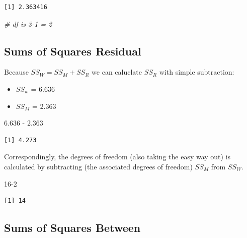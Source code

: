 \documentclass[
  11pt,
]{book}
\newenvironment{Shaded}{\begin{snugshade}}{\end{snugshade}}
\newcommand{\CommentTok}[1]{\textcolor[rgb]{0.56,0.35,0.01}{\textit{#1}}}
\newcommand{\DecValTok}[1]{\textcolor[rgb]{0.00,0.00,0.81}{#1}}
\newcommand{\FloatTok}[1]{\textcolor[rgb]{0.00,0.00,0.81}{#1}}
\newcommand{\SpecialCharTok}[1]{\textcolor[rgb]{0.00,0.00,0.00}{#1}}
\providecommand{\tightlist}{%
  \setlength{\itemsep}{0pt}\setlength{\parskip}{0pt}}
\begin{document}
\begin{verbatim}
[1] 2.363416
\end{verbatim}

\begin{Shaded}
\begin{Highlighting}[]
\CommentTok{\# df is 3{-}1 = 2}
\end{Highlighting}
\end{Shaded}

\hypertarget{sums-of-squares-residual}{%
\subsection{Sums of Squares Residual}\label{sums-of-squares-residual}}

Because \(SS_W = SS_M + SS_R\) we can caluclate \(SS_R\) with simple subtraction:

\begin{itemize}
\tightlist
\item
  \(SS_w\) = 6.636
\item
  \(SS_M\) = 2.363
\end{itemize}

\begin{Shaded}
\begin{Highlighting}[]
\FloatTok{6.636} \SpecialCharTok{{-}} \FloatTok{2.363}
\end{Highlighting}
\end{Shaded}

\begin{verbatim}
[1] 4.273
\end{verbatim}

Correspondingly, the degrees of freedom (also taking the easy way out) is calculated by subtracting (the associated degrees of freedom) \(SS_M\) from \(SS_W\).

\begin{Shaded}
\begin{Highlighting}[]
\DecValTok{16{-}2}
\end{Highlighting}
\end{Shaded}

\begin{verbatim}
[1] 14
\end{verbatim}

\hypertarget{sums-of-squares-between}{%
\subsection{Sums of Squares Between}\label{sums-of-squares-between}}
\end{document}
